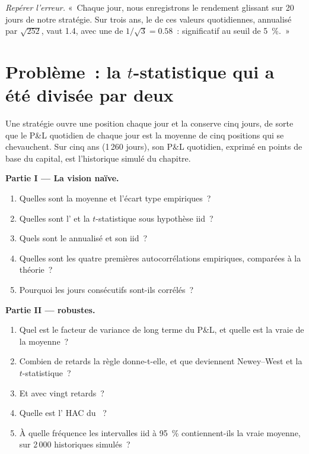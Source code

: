 \begin{exercise}[$\star\star\star$]\label{exo:qm:estimation:8}
\emph{Repérer l'erreur.} «~Chaque jour, nous enregistrons le rendement glissant sur 20 jours de notre stratégie. Sur trois ans, le  de ces
valeurs quotidiennes, annualisé par $\sqrt{252}$, vaut 1.4, avec une  de $1/\sqrt3 = 0.58$~: significatif au seuil de 5~\%.~»
\end{exercise}

\section{Problème~: la $t$-statistique qui a été divisée par deux}

\begin{problem}\label{pb:qm:estimation:1}
Une stratégie ouvre une position chaque jour et la conserve cinq jours, de sorte que le P\&L quotidien de chaque jour est la moyenne de cinq positions qui se chevauchent.
Sur cinq ans (1\,260 jours), son P\&L quotidien, exprimé en points de base du capital, est l'historique simulé du chapitre.

\medskip\noindent\textbf{Partie I --- La vision naïve.}
\begin{enumerate}
\item Quelles sont la moyenne et l'écart type empiriques~?
\item Quelles sont l' et la $t$-statistique sous hypothèse iid~?
\item Quels sont le  annualisé et son  iid~?
\item Quelles sont les quatre premières autocorrélations empiriques, comparées à la théorie~?
\item Pourquoi les jours consécutifs sont-ils corrélés~?
\end{enumerate}

\medskip\noindent\textbf{Partie II ---  robustes.}
\begin{enumerate}[resume]
\item Quel est le facteur de variance de long terme du P\&L, et quelle est la vraie  de la moyenne~?
\item Combien de retards la règle donne-t-elle, et que deviennent Newey--West et la $t$-statistique~?
\item Et avec vingt retards~?
\item Quelle est l' HAC du ~?
\item À quelle fréquence les intervalles iid à 95~\% contiennent-ils la vraie moyenne, sur 2\,000 historiques simulés~?
\end{enumerate}


\end{problem}
